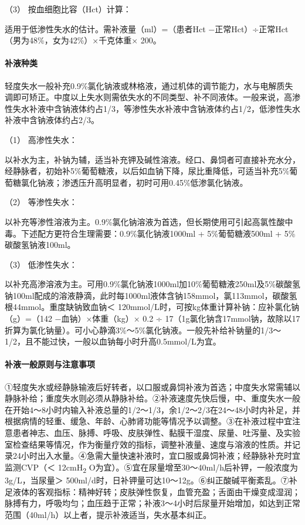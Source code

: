 \hypertarget{text00190.htmlux5cux23CHP6-1-1-3-2-1-3}{}
（3） 按血细胞比容（Hct）计算：

适用于低渗性失水的估计。需补液量（ml）=（患者Hct
−正常Hct）÷正常Hct（男为48\%，女为42\%）×千克体重× 200。

\paragraph{补液种类}

轻度失水一般补充0.9\%氯化钠液或林格液，通过机体的调节能力，水与电解质失调即可矫正。中度以上失水则需依失水的不同类型、补不同液体。一般来说，高渗性失水补液中含钠液体约占1/3，等渗性失水补液中含钠液体约占1/2，低渗性失水补液中含钠液体约占2/3。

\hypertarget{text00190.htmlux5cux23CHP6-1-1-3-2-2-1}{}
（1） 高渗性失水：

以补水为主，补钠为辅，适当补充钾及碱性溶液。经口、鼻饲者可直接补充水分，经静脉者，初始补5\%葡萄糖液，以后如血钠下降，尿比重降低，可适当补充5\%葡萄糖氯化钠液；渗透压升高明显者，初时可用0.45\%低渗氯化钠液。

\hypertarget{text00190.htmlux5cux23CHP6-1-1-3-2-2-2}{}
（2） 等渗性失水：

以补充等渗性溶液为主。0.9\%氯化钠溶液为首选，但长期使用可引起高氯性酸中毒。下述配方更符合生理需要：0.9\%氯化钠液1000ml
+ 5\%葡萄糖液500ml + 5\%碳酸氢钠液100ml。

\hypertarget{text00190.htmlux5cux23CHP6-1-1-3-2-2-3}{}
（3） 低渗性失水：

以补充高渗溶液为主。可用0.9\%氯化钠液1000ml加10\%葡萄糖液250ml及5\%碳酸氢钠100ml配成的溶液静滴，此时每1000ml液体含钠158mmol，氯113mmol，碳酸氢根44mmol。重度缺钠致血钠＜
120mmol/L时，可按kg体重计算补钠：应补氯化钠（g）=（142
−血钠）×体重（kg）× 0.2 ÷
17（1g氯化钠含17mmol钠，故除以17折算为氯化钠量）。可小心静滴3\%～5\%氯化钠液。一般先补给补钠量的1/3～1/2，且不能过快，一般以血钠每小时升高0.5mmol/L为宜。

\paragraph{补液一般原则与注意事项}

①轻度失水或经静脉输液后好转者，以口服或鼻饲补液为首选；中度失水常需辅以静脉补给；重度失水则必须从静脉补给。②补液速度先快后慢，中、重度失水一般在开始4～8小时内输入补液总量的1/2～1/3，余1/2～2/3在24～48小时内补足，并根据病情的轻重、缓急、年龄、心肺肾功能等情况予以调整。③在补液过程中宜注意患者神志、血压、脉搏、呼吸、皮肤弹性、黏膜干湿度、尿量、吐泻量、及实验室检查结果等情况，作为衡量疗效的指标，调整补液量、速度与溶液的性质。并记录24小时出入水量。④急需大量快速补液时，宜口服或鼻饲补液；经静脉补充时宜监测CVP（＜
12cmH\textsubscript{2}
O为宜）。⑤宜在尿量增至30～40ml/h后补钾，一般浓度为3g/L，当尿量＞
500ml/d时，日补钾量可达10～12g。⑥纠正酸碱平衡紊乱。⑦补足液体的客观指标：精神好转；皮肤弹性恢复，血管充盈；舌面由干燥变成湿润；脉搏有力，呼吸均匀；血压趋于正常；补液3～4小时后尿量开始增加，如达到正常范围（40ml/h）以上者，提示补液适当，失水基本纠正。

